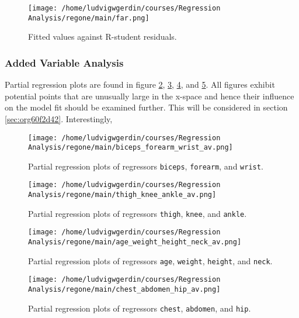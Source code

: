 \documentclass[11pt]{article}
\begin{document}
\begin{figure}[htbp]
\centering
\texttt{[image: /home/ludvigwgerdin/courses/Regression Analysis/regone/main/far.png]}
\caption{\label{fig:org53c733b}
Fitted values against R-student residuals.}
\end{figure}

\subsubsection{Added Variable Analysis}
\label{sec:org5bd47fb}

Partial regression plots are found in figure \ref{fig:orgd5f43f4}, \ref{fig:orgc49f163},
\ref{fig:orgad73196}, and \ref{fig:orgb796e66}. All figures exhibit potential points 
that are unusually large in the x-space and hence their influence on the model fit should be 
examined further. This will be considered in section \ref{sec:org60f2d42}.
Interestingly, 

\begin{figure}[htbp]
\centering
\texttt{[image: /home/ludvigwgerdin/courses/Regression Analysis/regone/main/biceps\_forearm\_wrist\_av.png]}
\caption{\label{fig:orgd5f43f4}
Partial regression plots of regressors \texttt{biceps}, \texttt{forearm}, and \texttt{wrist}.}
\end{figure}   

\begin{figure}[htbp]
\centering
\texttt{[image: /home/ludvigwgerdin/courses/Regression Analysis/regone/main/thigh\_knee\_ankle\_av.png]}
\caption{\label{fig:orgc49f163}
Partial regression plots of regressors \texttt{thigh}, \texttt{knee}, and \texttt{ankle}.}
\end{figure}

\begin{figure}[htbp]
\centering
\texttt{[image: /home/ludvigwgerdin/courses/Regression Analysis/regone/main/age\_weight\_height\_neck\_av.png]}
\caption{\label{fig:orgad73196}
Partial regression plots of regressors \texttt{age}, \texttt{weight}, \texttt{height}, and \texttt{neck}.}
\end{figure}

\begin{figure}[htbp]
\centering
\texttt{[image: /home/ludvigwgerdin/courses/Regression Analysis/regone/main/chest\_abdomen\_hip\_av.png]}
\caption{\label{fig:orgb796e66}
Partial regression plots of regressors \texttt{chest}, \texttt{abdomen}, and \texttt{hip}.}
\end{figure}
\end{document}

